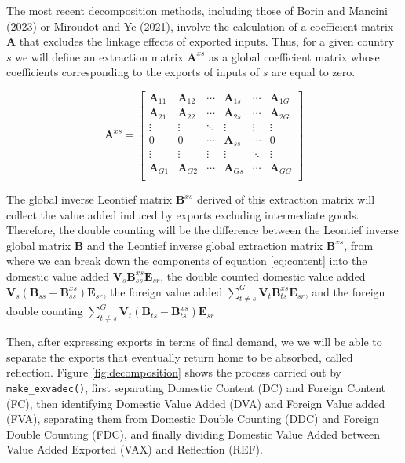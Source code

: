 The most recent decomposition methods, including those of Borin and Mancini (2023)
or Miroudot and Ye (2021), involve the calculation of a coefficient matrix
\(\mathbf{A}\) that excludes the linkage effects of exported inputs. Thus, for a
given country \(s\) we will define an extraction matrix \(\mathbf{A}^{xs}\) as a
global coefficient matrix whose coefficients corresponding to the exports of
inputs of \(s\) are equal to zero.

\begin{equation}
    \mathbf{A}^{xs}
    =
    \left[
    \begin{matrix}
    \mathbf{A}_{11} &
    \mathbf{A}_{12} &
    \cdots &
    \mathbf{A}_{1s} &
    \cdots &
    \mathbf{A}_{1G} \\
    \mathbf{A}_{21} &
    \mathbf{A}_{22} &
    \cdots &
    \mathbf{A}_{2s} &
    \cdots &
    \mathbf{A}_{2G} \\
    \vdots & \vdots & \ddots & \vdots & \vdots & \vdots \\
    0 &
    0 &
    \cdots &
    \mathbf{A}_{ss} &
    \cdots &
    0 \\
    \vdots & \vdots & \vdots & \vdots & \ddots & \vdots \\
    \mathbf{A}_{G1} &
    \mathbf{A}_{G2} &
    \cdots&
    \mathbf{A}_{Gs}&
    \cdots&
    \mathbf{A}_{GG} \\
    \end{matrix}
    \right]
    \label{eq:Anots}
\end{equation}

The global inverse Leontief matrix \(\mathbf{B}^{xs}\) derived of this
extraction matrix will collect the value added induced by exports excluding
intermediate goods. Therefore, the double counting will be the difference
between the Leontief inverse global matrix \(\mathbf{B}\) and the Leontief
inverse global extraction matrix \(\mathbf{B}^{xs}\), from where we can break
down the components of equation \eqref{eq:content} into the domestic value added
\({\mathbf{V}}_s \mathbf{B}^{xs}_{ss} \mathbf{E}_{sr}\), the
double counted domestic value added
\({\mathbf{V}}_s (\mathbf{B}_{ss} - \mathbf{B}^{xs}_{ss}) \mathbf{E}_{sr}\),
the foreign value added
\(\sum_{t\neq s}^{G}{{\mathbf{V}}_t \mathbf{B}^{xs}_{ts} \mathbf{E}_{sr}}\),
and the foreign double counting
\(\sum_{t\neq s}^{G}{{\mathbf{V}}_t (\mathbf{B}_{ts} - \mathbf{B}^{xs}_{ts}) \mathbf{E}_{sr}}\)

Then, after expressing exports in terms of final demand, we we will be able to
separate the exports that eventually return home to be absorbed, called
reflection. Figure \ref{fig:decomposition} shows the process carried out by
\texttt{make\_exvadec()}, first separating Domestic Content (DC) and Foreign Content
(FC), then identifying Domestic Value Added (DVA) and Foreign Value added (FVA),
separating them from Domestic Double Counting (DDC) and Foreign Double Counting
(FDC), and finally dividing Domestic Value Added between Value Added Exported
(VAX) and Reflection (REF).

